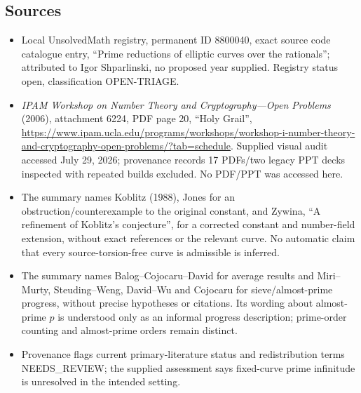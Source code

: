 \documentclass[11pt]{article}
\begin{document}
\subsection{Sources}
\begin{itemize}
\item Local UnsolvedMath registry, permanent ID 8800040, exact source code catalogue entry, ``Prime reductions of elliptic curves over the rationals''; attributed to Igor Shparlinski, no proposed year supplied. Registry status open, classification OPEN-TRIAGE.
\item \emph{IPAM Workshop on Number Theory and Cryptography---Open Problems} (2006), attachment 6224, PDF page 20, ``Holy Grail'', \url{https://www.ipam.ucla.edu/programs/workshops/workshop-i-number-theory-and-cryptography-open-problems/?tab=schedule}. Supplied visual audit accessed July 29, 2026; provenance records 17 PDFs/two legacy PPT decks inspected with repeated builds excluded. No PDF/PPT was accessed here.
\item The summary names Koblitz (1988), Jones for an obstruction/counterexample to the original constant, and Zywina, ``A refinement of Koblitz's conjecture'', for a corrected constant and number-field extension, without exact references or the relevant curve. No automatic claim that every source-torsion-free curve is admissible is inferred.
\item The summary names Balog--Cojocaru--David for average results and Miri--Murty, Steuding--Weng, David--Wu and Cojocaru for sieve/almost-prime progress, without precise hypotheses or citations. Its wording about almost-prime $p$ is understood only as an informal progress description; prime-order counting and almost-prime orders remain distinct.
\item Provenance flags current primary-literature status and redistribution terms NEEDS\_REVIEW; the supplied assessment says fixed-curve prime infinitude is unresolved in the intended setting.
\end{itemize}
\end{document}

